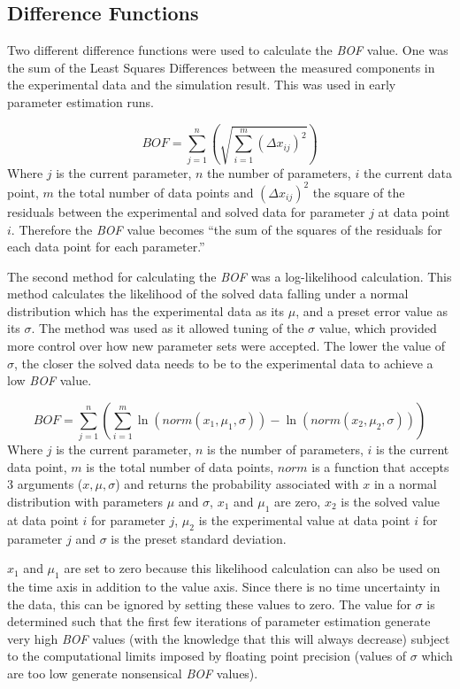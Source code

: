 \subsection{Difference Functions}
Two different difference functions were used to calculate the \textit{BOF} value. One was the sum of the Least Squares Differences between the measured components in the experimental data and the simulation result. This was used in early parameter estimation runs.

\begin{equation}
BOF = \sum^{n}_{j=1}\left(\sqrt{\sum^{m}_{i=1} (\Delta x_{ij})^2}\right)
\end{equation}
Where $j$ is the current parameter, $n$ the number of parameters, $i$ the current data point, $m$ the total number of data points and $(\Delta x_{ij})^2$ the square of the residuals between the experimental and solved data for parameter $j$ at data point $i$. Therefore the \textit{BOF} value becomes ``the sum of the squares of the residuals for each data point for each parameter.''

The second method for calculating the \textit{BOF} was a log-likelihood calculation. This method calculates the likelihood of the solved data falling under a normal distribution which has the experimental data as its $\mu$, and a preset error value as its $\sigma$. The method was used as it allowed tuning of the $\sigma$ value, which provided more control over how new parameter sets were accepted. The lower the value of $\sigma$, the closer the solved data needs to be to the experimental data to achieve a low \textit{BOF} value.

\begin{equation}
BOF = \sum^{n}_{j=1}\left(\sum^{m}_{i=1}\ln(norm(x_1,\mu_1,\sigma)) - \ln(norm(x_2,\mu_2,\sigma))\right)
\end{equation}
Where $j$ is the current parameter, $n$ is the number of parameters, $i$ is the current data point, $m$ is the total number of data points, $norm$ is a function that accepts 3 arguments ($x, \mu, \sigma$) and returns the probability associated with $x$ in a normal distribution with parameters $\mu$ and $\sigma$, $x_1$ and $\mu_1$ are zero, $x_2$ is the solved value at data point $i$ for parameter $j$, $\mu_2$ is the experimental value at data point $i$ for parameter $j$ and $\sigma$ is the preset standard deviation.

$x_1$ and $\mu_1$ are set to zero because this likelihood calculation can also be used on the time axis in addition to the value axis. Since there is no time uncertainty in the data, this can be ignored by setting these values to zero. The value for $\sigma$ is determined such that the first few iterations of parameter estimation generate very high \textit{BOF} values (with the knowledge that this will always decrease) subject to the computational limits imposed by floating point precision (values of $\sigma$ which are too low generate nonsensical \textit{BOF} values).

